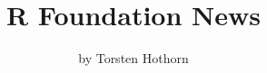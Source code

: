 \title{R Foundation News}
\author{by Torsten Hothorn}

\maketitle

\begin{verbatim}
\end{verbatim}


\address{%
Torsten Hothorn\\
\\%
\\
%
%
%
%
}
